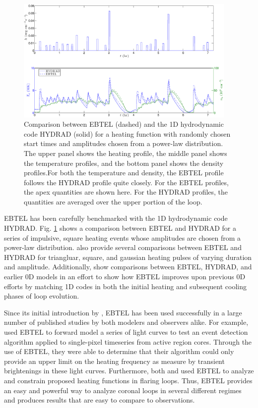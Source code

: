%
\begin{figure}
	\centering
	\includegraphics[width=0.95\textwidth]{figures/ebtel_sf_compare.eps}
	\caption{Comparison between EBTEL (dashed) and the 1D hydrodynamic code HYDRAD (solid) for a heating function with randomly chosen start times and amplitudes chosen from a power-law distribution. The upper panel shows the heating profile, the middle panel shows the temperature profiles, and the bottom panel shows the density profiles.For both the temperature and density, the EBTEL profile follows the HYDRAD profile quite closely. For the EBTEL profiles, the apex quantities are shown here. For the HYDRAD profiles, the quantities are averaged over the upper portion of the loop.}
	\label{fig:ebtel_sf_compare}
\end{figure}
%
\par EBTEL has been carefully benchmarked with the 1D hydrodynamic code HYDRAD. Fig. \ref{fig:ebtel_sf_compare} shows a comparison between EBTEL and HYDRAD for a series of impulsive, square heating events whose amplitudes are chosen from a power-law distribution. \citet{cargill_enthalpy-based_2012} also provide several comparisons between EBTEL and HYDRAD for triangluar, square, and gaussian heating pulses of varying duration and amplitude. Additionally, \citet{cargill_enthalpy-based_2012-1} show comparisons between EBTEL, HYDRAD, and earlier 0D models in an effort to show how EBTEL improves upon previous 0D efforts by matching 1D codes in both the initial heating and subsequent cooling phases of loop evolution.
%
\par Since its initial introduction by \citet{klimchuk_highly_2008}, EBTEL has been used successfully in a large number of published studies by both modelers and observers alike. For example, \citet{ugarte-urra_determining_2014} used EBTEL to forward model a series of light curves to test an event detection algorithm applied to single-pixel timeseries from active region cores. Through the use of EBTEL, they were able to determine that their algorithm could only provide an upper limit on the heating frequency as measure by transient brightenings in these light curves. Furthermore, both \citet{qiu_heating_2012} and \citet{liu_determining_2013} used EBTEL to analyze and constrain proposed heating functions in flaring loops. Thus, EBTEL provides an easy and powerful way to analyze coronal loops in several different regimes and produces results that are easy to compare to observations.
%
